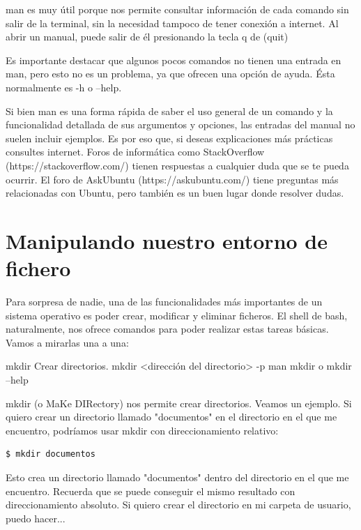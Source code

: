 man es muy útil porque nos permite consultar información de cada comando sin salir de la terminal, sin la necesidad tampoco de tener conexión a internet. Al abrir un manual, puede salir de él presionando la tecla q de (quit)

Es importante destacar que algunos pocos comandos no tienen una entrada en man, pero esto no es un problema, ya que ofrecen una opción de ayuda. Ésta normalmente es -h o --help.

Si bien man es una forma rápida de saber el uso general de un comando y la funcionalidad detallada de sus argumentos y opciones, las entradas del manual no suelen incluir ejemplos. Es por eso que, si deseas explicaciones más prácticas consultes internet. Foros de informática como StackOverflow (https://stackoverflow.com/) tienen respuestas a cualquier duda que se te pueda ocurrir. El foro de AskUbuntu (https://askubuntu.com/) tiene preguntas más relacionadas con Ubuntu, pero también es un buen lugar donde resolver dudas.

\section{Manipulando nuestro entorno de fichero}
Para sorpresa de nadie, una de las funcionalidades más importantes de un sistema operativo es poder crear, modificar y eliminar ficheros. El shell de bash, naturalmente, nos ofrece comandos para poder realizar estas tareas básicas. Vamos a mirarlas una a una:

\begin{command-info}
{mkdir}
{Crear directorios.}
{mkdir <dirección del directorio>}
{-p}
{man mkdir o mkdir --help}
\end{command-info}

mkdir (o MaKe DIRectory) nos permite crear directorios. Veamos un ejemplo. Si quiero crear un directorio llamado "documentos" en el directorio en el que me encuentro, podríamos usar mkdir con direccionamiento relativo:

\begin{tcolorbox-code}
\begin{lstlisting}
$ mkdir documentos
\end{lstlisting}
\end{tcolorbox-code}

Esto crea un directorio llamado "documentos" dentro del directorio en el que me encuentro. Recuerda que se puede conseguir el mismo resultado con direccionamiento absoluto. Si quiero crear el directorio en mi carpeta de usuario, puedo hacer...

